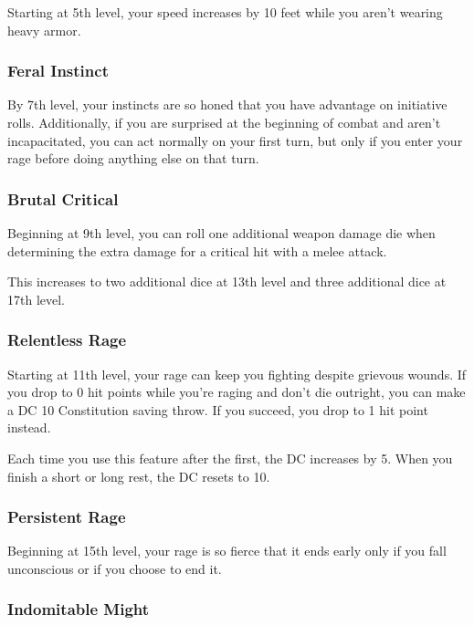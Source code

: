 Starting at 5th level, your speed increases by 10 feet while you aren't
wearing heavy armor.

\hypertarget{feral-instinct}{%
\subsubsection{Feral Instinct}\label{feral-instinct}}

By 7th level, your instincts are so honed that you have advantage on
initiative rolls. Additionally, if you are surprised at the beginning of
combat and aren't incapacitated, you can act normally on your first
turn, but only if you enter your rage before doing anything else on that
turn.

\hypertarget{brutal-critical}{%
\subsubsection{Brutal Critical}\label{brutal-critical}}

Beginning at 9th level, you can roll one additional weapon damage die
when determining the extra damage for a critical hit with a melee
attack.

This increases to two additional dice at 13th level and three additional
dice at 17th level.

\hypertarget{relentless-rage}{%
\subsubsection{Relentless Rage}\label{relentless-rage}}

Starting at 11th level, your rage can keep you fighting despite grievous
wounds. If you drop to 0 hit points while you're raging and don't die
outright, you can make a DC 10 Constitution saving throw. If you
succeed, you drop to 1 hit point instead.

Each time you use this feature after the first, the DC increases by 5.
When you finish a short or long rest, the DC resets to 10.

\hypertarget{persistent-rage}{%
\subsubsection{Persistent Rage}\label{persistent-rage}}

Beginning at 15th level, your rage is so fierce that it ends early only
if you fall unconscious or if you choose to end it.

\hypertarget{indomitable-might}{%
\subsubsection{Indomitable Might}\label{indomitable-might}}


